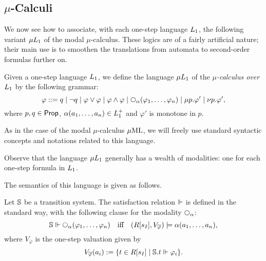 \subsection{$\mu$-Calculi}
\label{sec:onestep-to-mc}

We now see how to associate, with each one-step language $L_{1}$, the 
following variant $\mu L_{1}$ of the modal $\mu$-calculus.
These logics are of a fairly artificial nature; their main use is to smoothen
the translations from automata to second-order formulas further on.

\begin{definition}
Given a one-step language $L_{1}$, we define the language $\mu L_{1}$ of the 
\emph{$\mu$-calculus over $L_{1}$}  by the following grammar:
\[
\varphi \isbnf  
   q \mid \neg q 
   \mid \varphi\lor\varphi \mid \varphi\land\varphi 
   \mid \nxt{\al}(\varphi_{1},\ldots,\varphi_{n})
   \mid \mu p. \varphi'    \mid \nu p. \varphi',
\]
where $p,q \in\mathsf{Prop}$, $\alpha(a_{1},\ldots,a_{n}) \in L_{1}^{+}$ and $\varphi'$ 
is monotone in $p$.

As in the case of the modal $\mu$-calculus $\mu\mathrm{ML}$, we will freely use standard
syntactic concepts and notations related to this language.
\end{definition}

Observe that the language $\mu L_{1}$ generally has a wealth of modalities:
one for each one-step formula in $L_{1}$.

The semantics of this language is given as follows.

\begin{definition}
Let $\mathbb{S}$ be a transition system.
The satisfaction relation $\Vdash$ is defined in the standard way, with the 
following clause for the modality $\nxt{\alpha}$:
\begin{equation}\label{eq:mumod}
\bbS \mmodels \nxt{\al}(\varphi_{1},\ldots,\varphi_{n})
\quad\text{iff}\quad 
(R[s_{I}],V_{\overline{\varphi}}) \models \al(a_{1},\ldots,a_{n}),
\end{equation}
where $V_{\overline{\varphi}}$ is the one-step valuation given by 
\begin{equation}\label{eq:valmod}
V_{\overline{\varphi}}(a_{i}) \isdef 
  \{ t \in R[s_{I}] \mid \bbS.t \mmodels \varphi_{i}\}.
\end{equation}
\end{definition}

